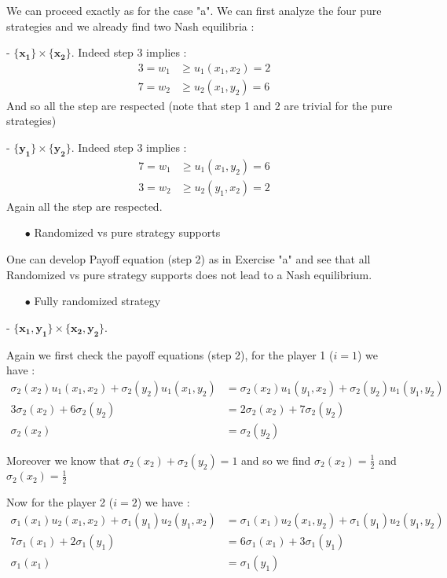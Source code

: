 We can proceed exactly as for the case "a". We can first analyze the four pure strategies and we already find two Nash equilibria :

- $\mathbf{\{x_1\}}\times\mathbf{\{x_2\}}$. Indeed step 3 implies :
\begin{align*}
    3=w_1&\ge u_1(x_1,x_2)=2 \\
    7=w_2&\ge u_2(x_1,y_2)=6 
\end{align*}
And so all the step are respected (note that step 1 and 2 are trivial for the pure strategies) 

- $\mathbf{\{y_1\}}\times\mathbf{\{y_2\}}$. Indeed step 3 implies :
\begin{align*}
    7 =w_1&\ge u_1(x_1,y_2)=6 \\
    3=w_2&\ge u_2(y_1,x_2)=2
\end{align*}
Again all the step are respected.


\begin{itemize}
  \item[$\bullet$] Randomized vs pure strategy supports
\end{itemize}

One can develop Payoff equation (step 2) as in Exercise "a" and see that all Randomized vs pure strategy supports does not lead to a Nash equilibrium.

\begin{itemize}
  \item[$\bullet$] Fully randomized strategy 
\end{itemize}
- $\mathbf{\{x_1,y_1\}}\times\mathbf{\{x_2,y_2\}}$.

Again we first check the payoff equations (step 2), for the player 1 ($i=1$) we have : 
\begin{align*}
 \sigma_2(x_2)u_1(x_1,x_2) + \sigma_2(y_2)u_1(x_1,y_2) &= \sigma_2(x_2)u_1(y_1,x_2) + \sigma_2(y_2)u_1(y_1,y_2) \\
 3\sigma_2(x_2)+6\sigma_2(y_2)&= 2\sigma_2(x_2) + 7\sigma_2(y_2) \\
 \sigma_2(x_2)&=\sigma_2(y_2)
\end{align*}

Moreover we know that $\sigma_2(x_2) + \sigma_2(y_2) = 1$ and so we find $\sigma_2(x_2)=\frac{1}{2}$ and $\sigma_2(x_2)=\frac{1}{2}$

Now for the player 2 ($i=2$) we have : 
\begin{align*}
 \sigma_1(x_1)u_2(x_1,x_2) + \sigma_1(y_1)u_2(y_1,x_2) &= \sigma_1(x_1)u_2(x_1,y_2) + \sigma_1(y_1)u_2(y_1,y_2) \\
 7\sigma_1(x_1)+2\sigma_1(y_1)&= 6\sigma_1(x_1) + 3\sigma_1(y_1) \\
 \sigma_1(x_1)&=\sigma_1(y_1)
\end{align*}

